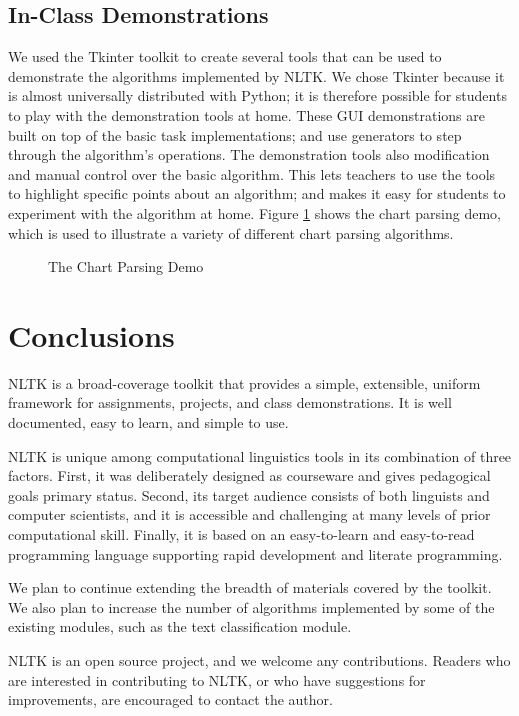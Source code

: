 \documentclass{article}
\begin{document}
\subsection{In-Class Demonstrations}

We used the Tkinter toolkit \cite{tkinter} to create several tools
that can be used to demonstrate the algorithms implemented by NLTK.
We chose Tkinter because it is almost universally distributed with
Python; it is therefore possible for students to play with the
demonstration tools at home.  These GUI demonstrations are built on
top of the basic task implementations; and use generators to step
through the algorithm's operations.  The demonstration tools also
modification and manual control over the basic algorithm.  This lets
teachers to use the tools to highlight specific points about an
algorithm; and makes it easy for students to experiment with the
algorithm at home.  Figure \ref{fig:chart} shows the chart parsing
demo, which is used to illustrate a variety of different chart parsing
algorithms.

\begin{figure}
\caption{The Chart Parsing Demo}
\label{fig:chart}
\end{figure}


\section{Conclusions}

NLTK is a broad-coverage toolkit that provides a simple, extensible,
uniform framework for assignments, projects, and class demonstrations.
It is well documented, easy to learn, and simple to use.

NLTK is unique among computational linguistics tools in its
combination of three factors.  First, it was deliberately designed as
courseware and gives pedagogical goals primary status.  Second, its
target audience consists of both linguists and computer scientists,
and it is accessible and challenging at many levels of prior
computational skill.  Finally, it is based on an easy-to-learn and
easy-to-read programming language supporting rapid development and
literate programming.

We plan to continue extending the breadth of materials covered by the
toolkit.  We also plan to increase the number of algorithms
implemented by some of the existing modules, such as the text
classification module.

NLTK is an open source project, and we welcome any contributions.
Readers who are interested in contributing to NLTK, or who have
suggestions for improvements, are encouraged to contact the author.
\end{document}

